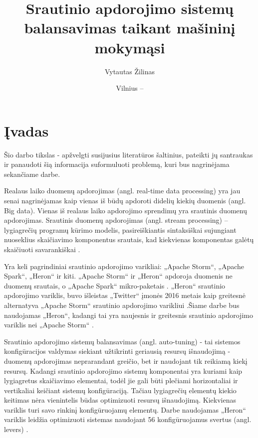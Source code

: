 \documentclass{VUMIFPSbakalaurinis}
\title{Srautinio apdorojimo sistemų balansavimas taikant mašininį mokymąsi}
\author{Vytautas Žilinas}
\date{Vilnius – \the\year}
\begin{document}
 
\maketitle

\cleardoublepage{}
\setcounter{page}{2}

\section{Įvadas}

Šio darbo tikslas - apžvelgti susijusius literatūros šaltinius, pateikti jų santraukas ir panaudoti šią informacija suformuluoti problemą, kuri bus nagrinėjama sekančiame darbe. 

Realaus laiko duomenų apdorojimas (angl. real-time data processing) yra jau senai nagrinėjamas kaip vienas iš būdų apdoroti didelių kiekių duomenis (angl. Big data). Vienas iš realaus laiko apdorojimo sprendimų yra srautinis duomenų apdorojimas. Srautinis duomenų apdorojimas (angl. stream processing) – lygiagrečių programų kūrimo modelis, pasireiškiantis sintaksiškai sujungiant nuoseklius skaičiavimo komponentus srautais, kad kiekvienas komponentas galėtų skaičiuoti savarankiškai \cite{shortstreamproc}. 

Yra keli pagrindiniai srautinio apdorojimo varikliai: „Apache Storm“, „Apache Spark“, „Heron“ ir kiti. „Apache Storm“ ir „Heron“ apdoroja duomenis ne duomenų srautais, o „Apache Spark“ mikro-paketais \cite{karau2015learning}. „Heron“ srautinio apdorojimo variklis, buvo išleistas „Twitter“ įmonės 2016 metais kaip greitesnė alternatyva „Apache Storm“ srautinio apdorojimo varikliui \cite{openSourcing}.Šiame darbe bus naudojamas „Heron“, kadangi tai yra naujesnis ir greitesnis srautinio apdorojimo variklis nei „Apache Storm“ \cite{twitterHeron}. 

Srautinio apdorojimo sistemų balansavimas (angl. auto-tuning) - tai sistemos konfigūracijos valdymas siekiant užtikrinti geriausią resursų išnaudojimą - duomenų apdorojimas neprarandant greičio, bet ir naudojant tik reikiamą kiekį resursų. Kadangi srautinio apdorojimo sistemų komponentai yra kuriami kaip lygiagretus skaičiavimo elementai, todėl jie gali būti plečiami horizontaliai ir vertikaliai \cite{shortstreamproc} keičiant sistemų konfigūraciją. Tačiau lygiagrečių elementų kiekio keitimas nėra vienintelis būdas optimizuoti resursų išnaudojimą. Kiekvienas variklis turi savo rinkinį konfigūruojamų elementų. Darbe naudojamas „Heron“ variklis leidžia optimizuoti sistemas naudojant 56 konfigūruojamus svertus (angl. levers) \cite{configDocument}.
\end{document}
